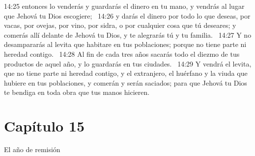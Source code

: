 14:25 entonces lo venderás y guardarás el dinero en tu mano, y vendrás al lugar que Jehová tu Dios escogiere;  
14:26 y darás el dinero por todo lo que deseas, por vacas, por ovejas, por vino, por sidra, o por cualquier cosa que tú deseares; y comerás allí delante de Jehová tu Dios, y te alegrarás tú y tu familia.  
14:27 Y no desampararás al levita que habitare en tus poblaciones; porque no tiene parte ni heredad contigo.  
14:28 Al fin de cada tres años sacarás todo el diezmo de tus productos de aquel año, y lo guardarás en tus ciudades.  
14:29 Y vendrá el levita, que no tiene parte ni heredad contigo, y el extranjero, el huérfano y la viuda que hubiere en tus poblaciones, y comerán y serán saciados; para que Jehová tu Dios te bendiga en toda obra que tus manos hicieren.  
\section*{Capítulo 15}
El año de remisión  

